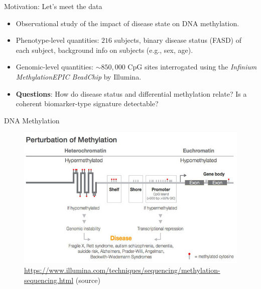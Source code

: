 \documentclass[12pt,t,handout]{beamer}
\begin{document}

\begin{frame}[c]{Motivation: Let's meet the data}

\begin{center}
\begin{itemize}
  \itemsep10pt
  \item Observational study of the impact of disease state on DNA methylation.
  \item Phenotype-level quantities: $216$ subjects, binary disease status (FASD)
    of each subject, background info on subjects (e.g., sex, age).
  \item Genomic-level quantities: $\sim 850,000$ CpG sites interrogated using
    the \textit{Infinium MethylationEPIC BeadChip} by Illumina.
  \item \textbf{Questions}: How do disease status and differential methylation
    relate? Is a coherent biomarker-type signature detectable?
\end{itemize}
\end{center}


\end{frame}


\begin{frame}[c]{DNA Methylation}

\begin{figure}[H]
  \centering
  \includegraphics[width=\textwidth]{dna_methylation}
  \caption{
    \url{https://www.illumina.com/techniques/sequencing/methylation-sequencing.html}
    (source)}
\end{figure}


\end{frame}
\end{document}
